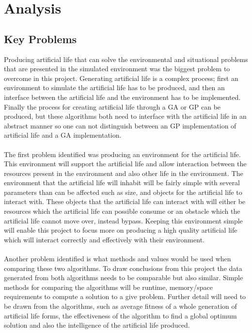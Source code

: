 \documentclass[12pt]{article}
\begin{document}
\section{Analysis}

\subsection{Key Problems}
Producing artificial life that can solve the environmental and situational problems that are presented in the simulated environment 
was the biggest problem to overcome in this project. Generating artificial life is a complex process; first an environment to simulate the artificial life has to be produced, and then
an interface between the artificial life and the environment has to be implemented. Finally the process for creating artificial life through a GA or GP can be produced, but these algorithms
both need to interface with the artificial life in an abstract manner so one can not distinguish between an GP implementation of artificial life and a GA implementation.

\paragraph{}
The first problem identified was producing an environment for the artificial life. This environment will support the artificial life and allow interaction between the resources present
in the environment and also other life in the environment. The environment that the artificial life will inhabit will be fairly simple with several parameters than can be affected such as
size, and objects for the artificial life to interact with. These objects that the artificial life can interact with will either be resources which the artificial life can possible consume
or an obstacle which the artificial life cannot move over, instead bypass. Keeping this environment simple will enable this project to focus more on producing a high quality artificial life
which will interact correctly and effectively with their environment. 

\paragraph{}
Another problem identified is what methods and values would be used when comparing these two algorithms. To draw conclusions from this project the data generated from both algorithms needs 
to be comparable but also similar. Simple methods for comparing the algorithms will be runtime, memory/space requirements to compute a solution to a give problem. Further detail will need to
be drawn from the algorithms, such as average fitness of a whole generation of artificial life forms, the effectiveness of the algorithm to find a global optimum solution and also the
intelligence of the artificial life produced. 
\end{document}
